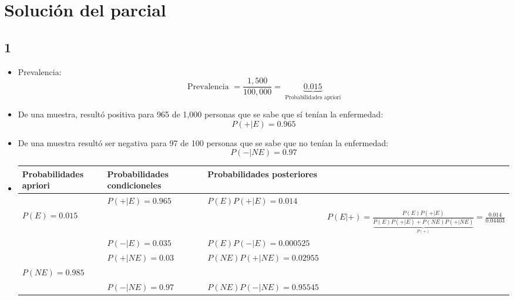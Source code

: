 \section{Solución del parcial}
\subsection{1}
\begin{itemize}
    \item Prevalencia:
        \[
          \text{  Prevalencia  } = \frac{1,500}{100,000} = \underbrace{0.015}_{\text{  Probabilidades apriori  }}
        \]
    
    \item De una muestra, resultó positiva para 965 de 1,000 personas que se sabe que sí tenían la enfermedad:
        \[
           P(+|E) = 0.965  
        \]
    
    \item De una muestra resultó ser negativa para 97 de 100 personas que se sabe que no tenían la enfermedad:
        \[
          P(-|NE) = 0.97 
        \]
    
    \item \begin{center}
       \begin{tabular}{ | p{5cm} | p{5cm} | p{5cm} | p{5cm} | }
                Probabilidades apriori & Probabilidades condicioneles & Probabilidades posteriores \\ 
           \hline
                                & $P(+|E) = 0.965$ & $P(E)P(+|E) = 0.014$     &\\ 
                $P(E) = 0.015$  &                  &                          & $P(E|+)= \frac{P(E)P(+|E)}{\underbrace{P(E)P(+|E)+P(NE)P(+|NE)}_{P(+)}} = \frac{0.014}{0.04403}  $  \\
                                & $P(-|E) = 0.035$ & $P(E)P(-|E) = 0.000525 $ &\\ 
                
            \hline
                                & $P(+|NE) = 0.03$ & $P(NE)P(+|NE) = 0.02955$ &\\ 
                $P(NE) = 0.985$ &                  &                          &\\ 
                                & $P(-|NE) = 0.97$ & $P(NE)P(-|NE) = 0.95545$ &\\ 
           \hline
       \end{tabular}
    \end{center}
    

\end{itemize}

